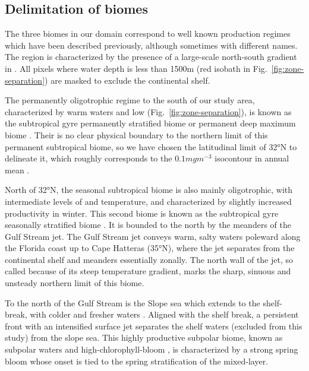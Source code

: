 \subsection{Delimitation of biomes}

The three biomes in our domain correspond to well known production regimes which have been described previously, although sometimes with different names.
The region is characterized by the presence of a large-scale north-south gradient in .
All pixels where water depth is less than 1500m (red isobath in Fig.~\ref{fig:zone-separation}) are masked to exclude the continental shelf.

The permanently oligotrophic regime to the south of our study area, characterized by warm waters and low  (Fig.~\ref{fig:zone-separation}), is known as the subtropical gyre permanently stratified biome \citep{sarmiento_2004} or permanent deep  maximum biome \citep{bock_2022}.
Their is no clear physical boundary to the northern limit of this permanent subtropical biome, so we have chosen the latitudinal limit of 32°N to delineate it, which roughly corresponds to the \(0.1 mg m^{-3}\)  isocontour in annual mean .

North of 32°N, the seasonal subtropical biome is also mainly oligotrophic, with intermediate levels of  and temperature, and characterized by slightly increased productivity in winter.
This second biome is known as the subtropical gyre seasonally stratified biome \citep{sarmiento_2004}.
It is bounded to the north by the meanders of the Gulf Stream jet.
The Gulf Stream jet conveys warm, salty waters poleward along the Florida coast up to Cape Hatteras (35°N), where the jet separates from the continental shelf and meanders essentially zonally.
The north wall of the jet, so called because of its steep temperature gradient, marks the sharp, sinuous and unsteady northern limit of this biome.

To the north of the Gulf Stream is the Slope sea which extends to the shelf-break, with colder and fresher waters \citep{linder_1998}.
Aligned with the shelf break, a persistent front with an intensified surface jet separates the shelf waters (excluded from this study) from the slope sea.
This highly productive subpolar biome, known as subpolar waters \citep{sarmiento_2004} and high-chlorophyll-bloom \citep{bock_2022}, is characterized by a strong spring bloom whose onset is tied to the spring stratification of the mixed-layer.


